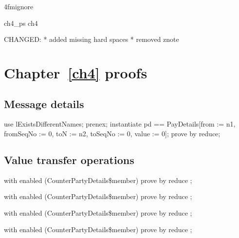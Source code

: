 \ai4fmignore{
\begin{zsection}
  \SECTION ch4\_ps \parents ch4
\end{zsection}
CHANGED:
* added missing hard spaces
* removed znote
}

\chapter{Chapter~\ref{ch4} proofs}

\section{Message details}

\begin{LPScript}\begin{zproof}[lExistsPayDetails]
    use lExistsDifferentNames;
    prenex;
    instantiate pd == \theta PayDetails[from := n1,
        fromSeqNo := 0, toN := n2, toSeqNo := 0, value := 0];
    prove by reduce;
\end{zproof}\end{LPScript}

\section{Value transfer operations}

\begin{LPScript}\begin{zproof}[fCounterPartyDetailsNameType]
   with enabled (CounterPartyDetails\$member) prove by reduce ;
\end{zproof}\end{LPScript}

\begin{LPScript}\begin{zproof}[fCounterPartyDetailsValueUpperBound]
   with enabled (CounterPartyDetails\$member) prove by reduce ;
\end{zproof}\end{LPScript}

\begin{LPScript}\begin{zproof}[fCounterPartyDetailsValueLowerBound]
   with enabled (CounterPartyDetails\$member) prove by reduce ;
\end{zproof}\end{LPScript}

\begin{LPScript}\begin{zproof}[fCounterPartyDetailsNextSeqNoUpperBound]
   with enabled (CounterPartyDetails\$member) prove by reduce ;
\end{zproof}\end{LPScript}

